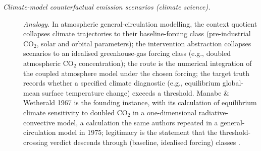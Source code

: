 \begin{description}
\item[\emph{Climate-model counterfactual emission
scenarios (climate science).}] \textit{Analogy.}
In atmospheric general-circulation modelling, the
context quotient collapses climate trajectories to
their baseline-forcing class (pre-industrial CO\(_2\),
solar and orbital parameters); the intervention
abstraction collapses scenarios to an idealised
greenhouse-gas forcing class (e.g., doubled
atmospheric CO\(_2\) concentration); the route is the
numerical integration of the coupled atmosphere
model under the chosen forcing; the target truth
records whether a specified climate diagnostic (e.g.,
equilibrium global-mean surface temperature change)
exceeds a threshold.  Manabe \& Wetherald 1967 is the
founding instance, with its calculation of equilibrium
climate sensitivity to doubled CO\(_2\) in a one-dimensional
radiative-convective model, a calculation the same authors repeated
in a general-circulation model in 1975; legitimacy
is the  statement that the threshold-crossing
verdict descends through (baseline, idealised forcing)
classes \citep{ManabeWetherald1967Thermal,ManabeWetherald1975Doubling}.
\end{description}
\endgroup

